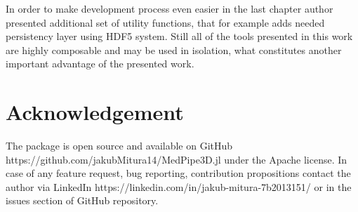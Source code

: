 \documentclass[preprint,12pt]{elsarticle}
\begin{document}
In order to make development process even easier in the last chapter author presented additional set of utility functions, that for example adds needed persistency layer  using HDF5 system. Still all of the tools presented in this work are highly composable and may be used in isolation, what constitutes another important advantage of the presented work. 

\section*{Acknowledgement}
The package is open source and available on GitHub https://github.com/jakubMitura14/MedPipe3D.jl under the Apache license. In case of any feature request, bug reporting, contribution propositions contact the author via LinkedIn https://linkedin.com/in/jakub-mitura-7b2013151/ or in the issues section of GitHub repository.

  
 





\end{document}
